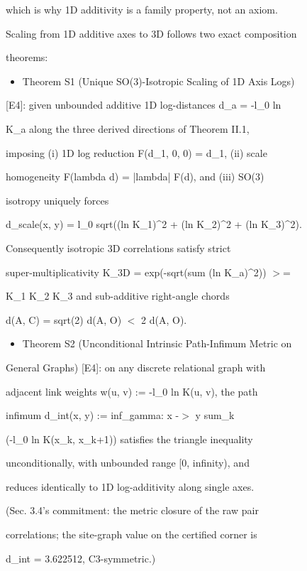 \documentclass[11pt,a4paper]{article}
\theoremstyle{definition}
\begin{document}
which is why 1D additivity is a family property, not an axiom.

Scaling from 1D additive axes to 3D follows two exact composition

theorems:


\begin{itemize}[leftmargin=1.4em]
\item Theorem S1 (Unique SO(3)-Isotropic Scaling of 1D Axis Logs)
\end{itemize}
    [E4]: given unbounded additive 1D log-distances d\_a = -l\_0 ln

    K\_a along the three derived directions of Theorem II.1,

    imposing (i) 1D log reduction F(d\_1, 0, 0) = d\_1, (ii) scale

    homogeneity F(lambda d) = |lambda| F(d), and (iii) SO(3)

    isotropy uniquely forces

    d\_scale(x, y) = l\_0 sqrt((ln K\_1)\^{}2 + (ln K\_2)\^{}2 + (ln K\_3)\^{}2).

    Consequently isotropic 3D correlations satisfy strict

    super-multiplicativity K\_3D = exp(-sqrt(sum (ln K\_a)\^{}2)) $>$=

    K\_1 K\_2 K\_3 and sub-additive right-angle chords

    d(A, C) = sqrt(2) d(A, O) $<$ 2 d(A, O).

\begin{itemize}[leftmargin=1.4em]
\item Theorem S2 (Unconditional Intrinsic Path-Infimum Metric on
\end{itemize}
    General Graphs) [E4]: on any discrete relational graph with

    adjacent link weights w(u, v) := -l\_0 ln K(u, v), the path

    infimum d\_int(x, y) := inf\_{gamma: x -$>$ y} sum\_k

    (-l\_0 ln K(x\_k, x\_{k+1})) satisfies the triangle inequality

    unconditionally, with unbounded range [0, infinity), and

    reduces identically to 1D log-additivity along single axes.

    (Sec. 3.4's commitment: the metric closure of the raw pair

    correlations; the site-graph value on the certified corner is

    d\_int = 3.622512, C3-symmetric.)
\end{document}
